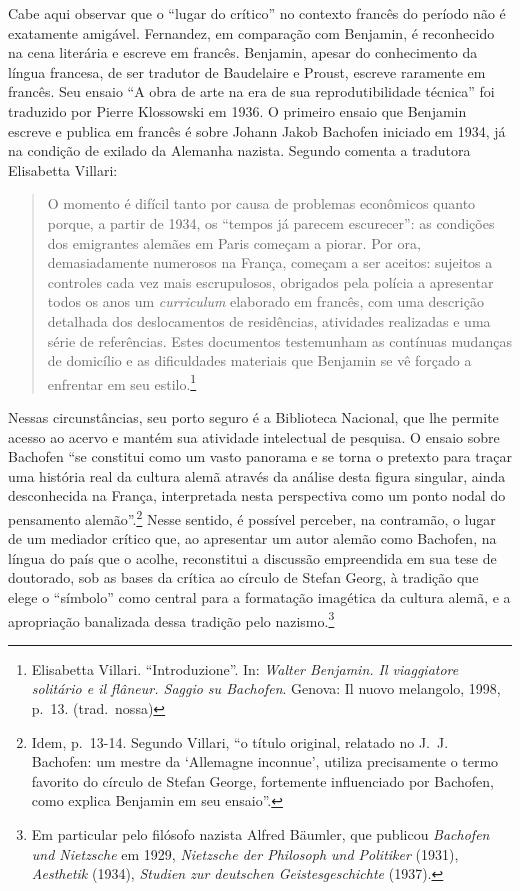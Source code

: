 Cabe aqui observar que o ``lugar do crítico'' no contexto francês do
período não é exatamente amigável. Fernandez, em comparação com
Benjamin, é reconhecido na cena literária e escreve em francês.
Benjamin, apesar do conhecimento da língua francesa, de ser tradutor de
Baudelaire e Proust, escreve raramente em francês. Seu ensaio ``A obra
de arte na era de sua reprodutibilidade técnica'' foi traduzido por
Pierre Klossowski em 1936. O primeiro ensaio que Benjamin escreve e
publica em francês é sobre Johann Jakob Bachofen iniciado em 1934, já na
condição de exilado da Alemanha nazista. Segundo comenta a tradutora
Elisabetta Villari:

\begin{quote}
O momento é difícil tanto por causa de problemas econômicos quanto
porque, a partir de 1934, os ``tempos já parecem escurecer'': as
condições dos emigrantes alemães em Paris começam a piorar. Por ora,
demasiadamente numerosos na França, começam a ser aceitos: sujeitos a
controles cada vez mais escrupulosos, obrigados pela polícia a
apresentar todos os anos um \emph{curriculum} elaborado em francês, com
uma descrição detalhada dos deslocamentos de residências, atividades
realizadas e uma série de referências. Estes documentos testemunham as
contínuas mudanças de domicílio e as dificuldades materiais que Benjamin
se vê forçado a enfrentar em seu estilo.\footnote{Elisabetta Villari. ``Introduzione''. %
  In: \emph{Walter Benjamin. Il viaggiatore solitário e il flâneur.
  Saggio su Bachofen}. Genova: Il nuovo melangolo, 1998, p.~13. (trad.~nossa)}
\end{quote}

Nessas circunstâncias, seu porto seguro é a Biblioteca Nacional, que lhe
permite acesso ao acervo e mantém sua atividade intelectual de pesquisa.
O ensaio sobre Bachofen ``se constitui como um vasto panorama e se torna
o pretexto para traçar uma história real da cultura alemã através da
análise desta figura singular, ainda desconhecida na França,
interpretada nesta perspectiva como um ponto nodal do pensamento
alemão''.\footnote{Idem, p.~13-14. Segundo Villari, ``o título original,
  relatado no J.~J. Bachofen: um mestre da `Allemagne inconnue', utiliza
  precisamente o termo favorito do círculo de Stefan George, fortemente
  influenciado por Bachofen, como explica Benjamin em seu ensaio''.}
Nesse sentido, é possível perceber, na contramão, o lugar de um mediador
crítico que, ao apresentar um autor alemão como Bachofen, na língua do
país que o acolhe, reconstitui a discussão empreendida em sua tese de
doutorado, sob as bases da crítica ao círculo de Stefan Georg, à
tradição que elege o ``símbolo'' como central para a formatação
imagética da cultura alemã, e a apropriação banalizada dessa tradição
pelo nazismo.\footnote{Em particular pelo filósofo nazista Alfred
  Bäumler, que publicou \emph{Bachofen und Nietzsche} em 1929,
  \emph{Nietzsche der Philosoph und Politiker} (1931), \emph{Aesthetik}
  (1934), \emph{Studien zur deutschen Geistesgeschichte} (1937).}

